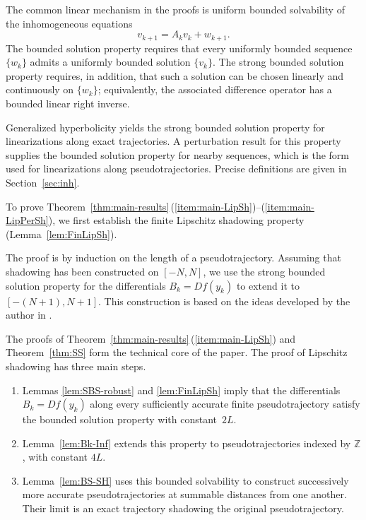 \documentclass[12pt]{article}
\newcommand{\Zz}{\mathbb{Z}}
\theoremstyle{definition}
\begin{document}
The common linear mechanism in the proofs is uniform bounded solvability of the inhomogeneous equations
\[
v_{k+1}=A_kv_k+w_{k+1}.
\]
The bounded solution property requires that every uniformly bounded sequence $\{w_k\}$ admits a uniformly bounded  solution $\{v_k\}$. 
The strong bounded solution property requires, in addition, that such a solution can be chosen linearly and continuously on $\{w_k\}$; equivalently, the associated difference operator has a bounded linear right inverse.

Generalized hyperbolicity yields the strong bounded solution property for linearizations along exact trajectories. A perturbation result for this property supplies the bounded solution property for nearby sequences, which is the form used for linearizations along pseudotrajectories. Precise definitions are given in Section~\ref{sec:inh}.


To prove Theorem~\ref{thm:main-results}\,(\ref{item:main-LipSh})--(\ref{item:main-LipPerSh}), we first establish the finite Lipschitz shadowing property (Lemma~\ref{lem:FinLipSh}).

The proof is by induction on the length of a pseudotrajectory.
Assuming that shadowing has been constructed on $[-N,N]$, we use the strong bounded solution property for the differentials $B_k=Df(y_k)$ to extend it to $[-(N+1),N+1]$. 
This construction is based on the ideas developed by the author in \cite{TikhZapSem, MonTikh, TikhHolSh}.

The proofs of Theorem~\ref{thm:main-results}\,(\ref{item:main-LipSh}) and Theorem~\ref{thm:SS} form the technical core of the paper. 
The proof of Lipschitz shadowing has three main steps.

\begin{enumerate}
    \item Lemmas \ref{lem:SBS-robust} and \ref{lem:FinLipSh} imply that the differentials $B_k=Df(y_k)$ along every sufficiently accurate finite pseudotrajectory satisfy the bounded solution property with constant~$2L$.

    \item Lemma~\ref{lem:Bk-Inf} extends this property to pseudotrajectories indexed by $\Zz$, with constant $4L$.

    \item Lemma~\ref{lem:BS-SH} uses this bounded solvability to construct successively more accurate pseudotrajectories at summable distances from one another. 
    Their limit is an exact trajectory shadowing the original pseudotrajectory.
\end{enumerate}
\end{document}
